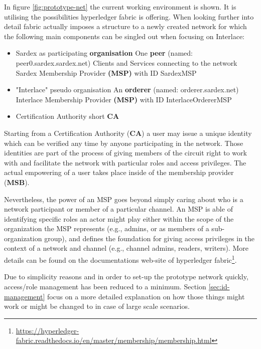 In figure \ref{fig:prototype-net} the current working environment is shown. It is utilising the possibilities hyperledger fabric is offering. When looking further into detail fabric actually imposes a structure to a newly created network for which the following main components can be singled out when focusing on Interlace:

\begin{itemize}
	\item Sardex as participating \textbf{organisation}
		\subitem One  \textbf{peer} (named: peer0.sardex.sardex.net)
		\subitem Clients and Services connecting to the network
		\subitem Sardex Membership Provider \textbf{(MSP)} with ID SardexMSP
	\item "Interlace" pseudo organisation
		\subitem An \textbf{orderer} (named: orderer.sardex.net)
		\subitem Interlace Membership Provider \textbf{(MSP)} with ID InterlaceOrdererMSP
	\item Certification Authority short \textbf{CA}
\end{itemize}

Starting from a Certification Authority (\textbf{CA}) a user may issue a unique identity which can be verified any time by anyone participating in the network. Those identities are part of the process of giving members of the circuit right to work with and facilitate the network with particular roles and access privileges. The actual empowering of a user takes place inside of the membership provider (\textbf{MSB}).

Nevertheless, the power of an MSP goes beyond simply caring about who is a network participant or member of a particular channel. An MSP is able of identifying specific roles an actor might play either within the scope of the organization the MSP represents (e.g., admins, or as members of a sub-organization group), and defines the foundation for giving access privileges in the context of a network and channel (e.g., channel admins, readers, writers). More details can be found on the documentations web-site of hyperledger fabric\footnote{\url{https://hyperledger-fabric.readthedocs.io/en/master/membership/membership.html}}.

Due to simplicity reasons and in order to set-up the prototype network quickly, access/role management has been reduced to a minimum. Section \ref{sec:id-management} focus on a more detailed explanation on how those things might work or might be changed to in case of large scale scenarios.  


